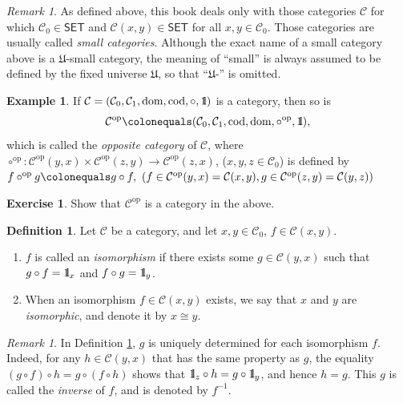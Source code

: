 \documentclass{surv-l}
\numberwithin{equation}{chapter}
\numberwithin{figure}{chapter}
\theoremstyle{plain}
\theoremstyle{definition}
\newtheorem{dfn}[thm]{Definition}
\newtheorem{exm}[thm]{Example}
\newtheorem{exc}[thm]{Exercise}
\theoremstyle{remark}
\newtheorem{rmk}[thm]{Remark}
\newcommand{\id}{1\kern-.25em{\text{{\rm l}}}}
\DeclareMathOperator{\dom}{dom}
\DeclareMathOperator{\cod}{cod}
\begin{document}
\begin{rmk}
As defined above, this book deals only with those categories
${\mathcal{C}}$ for which ${\mathcal{C}}_0 \in \mathsf{SET}$ and ${\mathcal{C}}(x, y) \in \mathsf{SET}$
for all $x, y \in {\mathcal{C}}_0$.
Those categories are usually called \emph{small categories}.
Although the exact name of a small category above is a $\mathfrak{U}$-small category,
the meaning of ``small'' is always assumed to be defined
by the fixed universe $\mathfrak{U}$, so that ``$\mathfrak{U}$-'' is omitted.
\end{rmk}

\begin{exm}\label{exm:op}
If ${\mathcal{C}} = ({\mathcal{C}}_0, {\mathcal{C}}_1, \dom, \cod, \circ, \id)$ is a category, then so is
\[
{\mathcal{C}}^{\mathrm{op}}\colonequals ({\mathcal{C}}_0, {\mathcal{C}}_1, \cod, \dom, \circ^{\mathrm{op}}, \id),
\]
which is called the \emph{opposite category} of ${\mathcal{C}}$, where
$\circ^{\mathrm{op}} \colon {\mathcal{C}}^{\mathrm{op}}(y,x) \times {\mathcal{C}}^{\mathrm{op}}(z,y) \to {\mathcal{C}}^{\mathrm{op}}(z,x)$,
($x, y, z \in {\mathcal{C}}_0$) is defined by
$f \circ^{\mathrm{op}} g\colonequals  g \circ f,\
(f \in {\mathcal{C}}^{\mathrm{op}}(y,x) = {\mathcal{C}}(x,y), g \in {\mathcal{C}}^{\mathrm{op}}(z,y) = {\mathcal{C}}(y,z))$
\end{exm}

\begin{exc}
Show that ${\mathcal{C}}^{\mathrm{op}}$ is a category in the above.
\end{exc}

\begin{dfn}\label{dfn:isomorphism}
Let ${\mathcal{C}}$ be a category, and let $x, y \in {\mathcal{C}}_0$, $f \in {\mathcal{C}}(x,y)$.
\begin{enumerate}
\item
$f$ is called an \emph{isomorphism} if there exists some $g \in {\mathcal{C}}(y, x)$ such that
$g\circ f = \id_x$ and $f \circ g = \id_y$.
\item
When an isomorphism $f \in {\mathcal{C}}(x, y)$ exists, we say that $x$ and $y$ are
\emph{isomorphic}\index{isomorphic}, and denote it by $x \cong y$.
\end{enumerate}
\end{dfn}

\begin{rmk}\label{rmk:inv-unique}
In Definition \ref{dfn:isomorphism}, $g$ is uniquely determined for each isomorphism $f$.
Indeed, for any $h \in {\mathcal{C}}(y,x)$ that has the same property as $g$,
the equality $(g\circ f) \circ h = g \circ (f \circ h)$ shows that
$\id_z \circ h = g \circ \id_y$, and hence $h = g$.
This $g$ is called the \emph{inverse} of $f$, and is denoted by $f^{-1}$.
\end{rmk}
\end{document}
